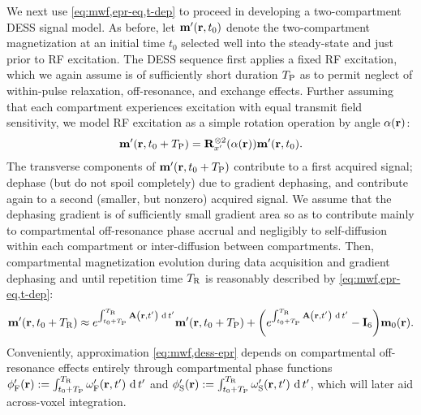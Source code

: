 We next use \eqref{eq:mwf,epr-eq,t-dep}
to proceed in developing a two-compartment DESS signal model.
As before,
let $\bmmp\prtz$ denote the two-compartment magnetization 
at an initial time $t_0$
selected well into the steady-state
and just prior to RF excitation.
The DESS sequence first applies a fixed RF excitation,
which we again assume
is of sufficiently short duration $T_\mathrm{P}$ 
as to permit neglect 
of within-pulse relaxation, off-resonance, and exchange effects.
Further assuming
that each compartment experiences excitation
with equal transmit field sensitivity,
we model RF excitation as a simple rotation operation
by angle $\flip\pr$:
\begin{align}
	\bmmp\paren{\bmr,t_0+\TP} = 
		\bmRxpsix{\flip\pr} \bmmp\prtz.
		\label{eq:mwf,dess-ex}
\end{align}
The transverse components
of $\bmmp\paren{\bmr,t_0+\TP}$
contribute to a first acquired signal;
dephase (but do not spoil completely)
due to gradient dephasing,
and contribute again 
to a second (smaller, but nonzero) acquired signal.
We assume that the dephasing gradient 
is of sufficiently small gradient area
so as to contribute
mainly to compartmental off-resonance phase accrual 
and
negligibly to self-diffusion 
within each compartment
or inter-diffusion between compartments.
Then, compartmental magnetization evolution
during data acquisition 
and gradient dephasing
and until repetition time $T_\mathrm{R}$
is reasonably described 
by \eqref{eq:mwf,epr-eq,t-dep}:
\begin{align}
	\bmmp\paren{\bmr,t_0+\TR} \approx
		e^{\int_{t_0+\TP}^{\TR} \bmA\paren{\bmr,t'} \der{t'}} \bmmp\paren{\bmr,t_0+\TP} +
		\paren{e^{\int_{t_0+\TP}^{\TR} \bmA\paren{\bmr,t'} \der{t'}} - \eye{6}} \bmmzero\pr.
	\label{eq:mwf,dess-epr}
\end{align}
Conveniently,
approximation \eqref{eq:mwf,dess-epr}
depends on compartmental off-resonance effects
entirely through compartmental phase functions
$\phipf\pr := \int_{t_0+\TP}^{\TR} \ompf\paren{\bmr,t'} \der t'$
and
$\phips\pr := \int_{t_0+\TP}^{\TR} \omps\paren{\bmr,t'} \der t'$,
which will later aid across-voxel integration. 

